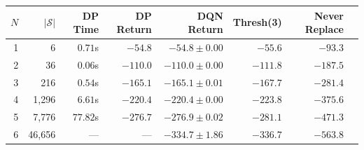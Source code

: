 \begin{tabular}{rrrrrrrr}
\toprule
$N$ & $|\mathcal{S}|$ & DP Time & DP Return & DQN Return & Thresh(3) & Never Replace \\
\midrule
1 & 6 & $0.71$s & $-54.8$ & $-54.8 \pm 0.00$ & $-55.6$ & $-93.3$ \\
2 & 36 & $0.06$s & $-110.0$ & $-110.0 \pm 0.00$ & $-111.8$ & $-187.5$ \\
3 & 216 & $0.54$s & $-165.1$ & $-165.1 \pm 0.01$ & $-167.7$ & $-281.4$ \\
4 & 1,296 & $6.61$s & $-220.4$ & $-220.4 \pm 0.00$ & $-223.8$ & $-375.6$ \\
5 & 7,776 & $77.82$s & $-276.7$ & $-276.9 \pm 0.02$ & $-281.1$ & $-471.3$ \\
6 & 46,656 & --- & --- & $-334.7 \pm 1.86$ & $-336.7$ & $-563.8$ \\
\bottomrule
\end{tabular}